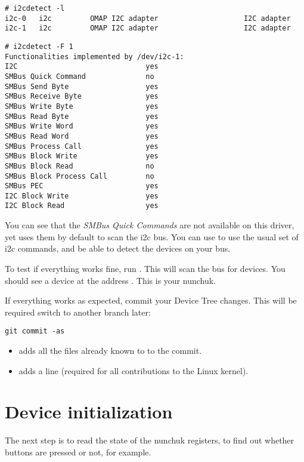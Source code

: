 \begin{verbatim}
# i2cdetect -l
i2c-0	i2c       	OMAP I2C adapter                	I2C adapter
i2c-1	i2c       	OMAP I2C adapter                	I2C adapter
\end{verbatim}

\begin{verbatim}
# i2cdetect -F 1
Functionalities implemented by /dev/i2c-1:
I2C                              yes
SMBus Quick Command              no
SMBus Send Byte                  yes
SMBus Receive Byte               yes
SMBus Write Byte                 yes
SMBus Read Byte                  yes
SMBus Write Word                 yes
SMBus Read Word                  yes
SMBus Process Call               yes
SMBus Block Write                yes
SMBus Block Read                 no
SMBus Block Process Call         no
SMBus PEC                        yes
I2C Block Write                  yes
I2C Block Read                   yes
\end{verbatim}

You can see that the {\em SMBus Quick Commands} are not available on
this driver, yet  uses them by default to scan the i2c
bus. You can use  to use the usual set of i2c
commands, and be able to detect the devices on your bus.

To test if everything works fine, run . This will
scan the  bus for devices. You should see a device at the
address . This is your nunchuk.

If everything works as expected, commit your Device Tree changes. This
will be required switch to another branch later:

\begin{verbatim}
git commit -as
\end{verbatim}

\begin{itemize}
\item {} adds all the files already known to
       to the commit.
\item {} adds a  line (required
      for all contributions to the Linux kernel).
\end{itemize}

\section{Device initialization}

The next step is to read the state of the nunchuk registers, to find out
whether buttons are pressed or not, for example.

